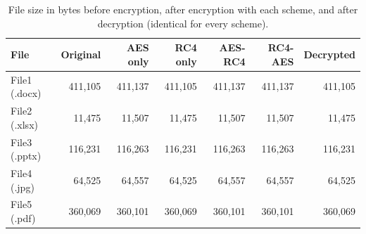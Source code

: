 \begin{table}[htbp]
\centering
\caption{File size in bytes before encryption, after encryption with each scheme, and after decryption (identical for every scheme).}
\label{tab:p3_sizes}
\small
\begin{tabular}{lrrrrrr}
\toprule
\textbf{File} & \textbf{Original} & \textbf{AES only} & \textbf{RC4 only} & \textbf{AES-RC4} & \textbf{RC4-AES} & \textbf{Decrypted} \\
\midrule
File1 (.docx) & 411,105 & 411,137 & 411,105 & 411,137 & 411,137 & 411,105 \\
File2 (.xlsx) & 11,475 & 11,507 & 11,475 & 11,507 & 11,507 & 11,475 \\
File3 (.pptx) & 116,231 & 116,263 & 116,231 & 116,263 & 116,263 & 116,231 \\
File4 (.jpg) & 64,525 & 64,557 & 64,525 & 64,557 & 64,557 & 64,525 \\
File5 (.pdf) & 360,069 & 360,101 & 360,069 & 360,101 & 360,101 & 360,069 \\
\bottomrule
\end{tabular}
\end{table}
